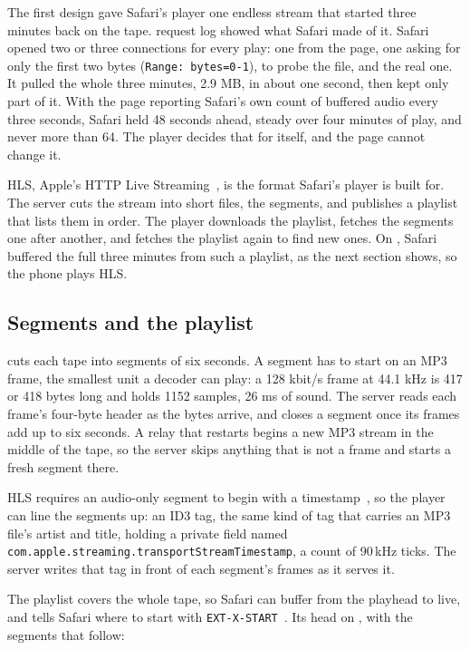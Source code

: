 \documentclass[11pt,a4paper]{article}
\begin{document}
The first design gave Safari's player one endless stream that started three minutes back on the tape.  request log showed what Safari made of it. Safari opened two or three connections for every play: one from the page, one asking for only the first two bytes (\texttt{Range: bytes=0-1}), to probe the file, and the real one. It pulled the whole three minutes, 2.9 MB, in about one second, then kept only part of it. With the page reporting Safari's own count of buffered audio every three seconds, Safari held 48 seconds ahead, steady over four minutes of play, and never more than 64. The player decides that for itself, and the page cannot change it.

HLS, Apple's HTTP Live Streaming~\cite{hls}, is the format Safari's player is built for. The server cuts the stream into short files, the segments, and publishes a playlist that lists them in order. The player downloads the playlist, fetches the segments one after another, and fetches the playlist again to find new ones. On , Safari buffered the full three minutes from such a playlist, as the next section shows, so the phone plays HLS.

\subsection*{Segments and the playlist}

 cuts each tape into segments of six seconds. A segment has to start on an MP3 frame, the smallest unit a decoder can play: a 128 kbit/s frame at 44.1 kHz is 417 or 418 bytes long and holds 1152 samples, 26 ms of sound. The server reads each frame's four-byte header as the bytes arrive, and closes a segment once its frames add up to six seconds. A relay that restarts begins a new MP3 stream in the middle of the tape, so the server skips anything that is not a frame and starts a fresh segment there.

HLS requires an audio-only segment to begin with a timestamp~\cite[§3.4 \textit{Packed Audio}]{hls}, so the player can line the segments up: an ID3 tag, the same kind of tag that carries an MP3 file's artist and title, holding a private field named \texttt{com.apple.streaming.transportStreamTimestamp}, a count of 90\,kHz ticks. The server writes that tag in front of each segment's frames as it serves it.

The playlist covers the whole tape, so Safari can buffer from the playhead to live, and tells Safari where to start with \texttt{EXT-X-START}~\cite[§4.3.5.2 \textit{EXT-X-START}]{hls}. Its head on , with the segments that follow:
\end{document}
